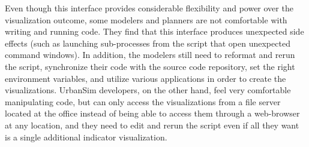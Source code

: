 Even though this interface provides considerable flexibility and power over
the visualization outcome, some modelers and planners are not 
comfortable with writing and running code. They find that this interface 
produces unexpected side effects (such as launching sub-processes from the
script that open unexpected command windows). In addition, the modelers
still need to reformat and rerun the script, synchronize their code with
the source code repository, set the right environment variables, and
utilize various applications in order to create the
visualizations. UrbanSim developers, on the other hand, feel very
comfortable manipulating code, but can only access the visualizations from a
file server located at the office instead of being able to access them
through a web-browser at any location, and they need to edit and rerun
the script even if all they want is a single additional 
indicator visualization.

